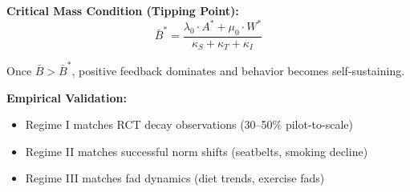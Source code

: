 \begin{tcolorbox}[colback=green!5!white, colframe=green!75!black,
    title=\textbf{Theorem NTM-T7: Stability Analysis and Phase Diagram}]
\textbf{Critical Mass Condition (Tipping Point):}
\begin{equation}
\bar{B}^* = \frac{\lambda_0 \cdot A^* + \mu_0 \cdot W^*}{\kappa_S + \kappa_T + \kappa_I}
\end{equation}

Once $\bar{B} > \bar{B}^*$, positive feedback dominates and behavior becomes self-sustaining.

\textbf{Empirical Validation:}
\begin{itemize}[nosep]
\item Regime I matches RCT decay observations (30--50\% pilot-to-scale) \citep{dellavigna2022rcts}
\item Regime II matches successful norm shifts (seatbelts, smoking decline) \citep{cialdini2004social}
\item Regime III matches fad dynamics (diet trends, exercise fads) \citep{rogers2003diffusion}
\end{itemize}

\end{tcolorbox}

